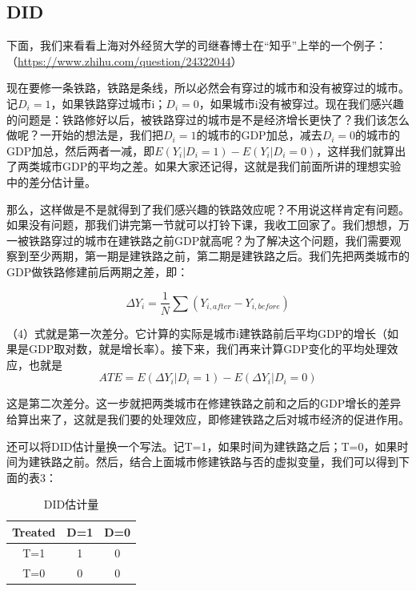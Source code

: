 \documentclass[cn,10pt,math=newtx,citestyle=gb7714-2015,bibstyle=gb7714-2015]{elegantbook}
\begin{document}
	\subsection{DID}
	
	下面，我们来看看上海对外经贸大学的司继春博士在“知乎”上举的一个例子：（\url{https://www.zhihu.com/question/24322044}）
	
	现在要修一条铁路，铁路是条线，所以必然会有穿过的城市和没有被穿过的城市。记$D_i=1$，如果铁路穿过城市i；$D_i=0$，如果城市i没有被穿过。现在我们感兴趣的问题是：铁路修好以后，被铁路穿过的城市是不是经济增长更快了？我们该怎么做呢？一开始的想法是，我们把$D_i=1$的城市的GDP加总，减去$D_i=0$的城市的GDP加总，然后两者一减，即$E(Y_i\big|D_i=1)-E(Y_i\big|D_i=0)$，这样我们就算出了两类城市GDP的平均之差。如果大家还记得，这就是我们前面所讲的理想实验中的差分估计量。
	
	那么，这样做是不是就得到了我们感兴趣的铁路效应呢？不用说这样肯定有问题。如果没有问题，那我们讲完第一节就可以打铃下课，我收工回家了。我们想想，万一被铁路穿过的城市在建铁路之前GDP就高呢？为了解决这个问题，我们需要观察到至少两期，第一期是建铁路之前，第二期是建铁路之后。我们先把两类城市的GDP做铁路修建前后两期之差，即：
	
	\begin{equation}
		\Delta{Y}_i=\frac{1}{N}\sum{(Y_{i,after}-Y_{i,before})}
	\end{equation}
	
	（4）式就是第一次差分。它计算的实际是城市i建铁路前后平均GDP的增长（如果是GDP取对数，就是增长率）。接下来，我们再来计算GDP变化的平均处理效应，也就是
	\begin{equation}
		ATE=E(\Delta{Y}_i\big|D_i=1)-E(\Delta{Y}_i\big|D_i=0)
	\end{equation}
	
	这是第二次差分。这一步就把两类城市在修建铁路之前和之后的GDP增长的差异给算出来了，这就是我们要的处理效应，即修建铁路之后对城市经济的促进作用。
	
	还可以将DID估计量换一个写法。记T=1，如果时间为建铁路之后；T=0，如果时间为建铁路之前。然后，结合上面城市修建铁路与否的虚拟变量，我们可以得到下面的表3：
	
	\begin{center}
		\begin{table}[!h]
			\caption{DID估计量}\label{tab:digit}
			\begin{center}
				\begin{tabular}{|c|c|c|}
					\hline
					Treated&D=1&D=0\\
					\hline
					T=1&1&0\\
					\hline
					T=0&0&0\\
					\hline
				\end{tabular}
			\end{center}
		\end{table}
	\end{center}
	
\end{document}
